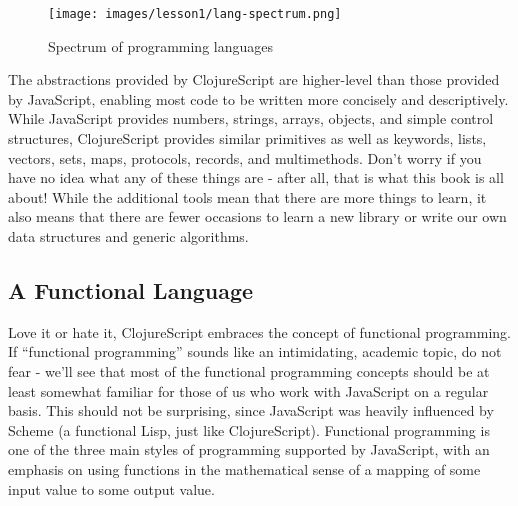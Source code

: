 \documentclass[10pt,twoside,openright]{memoir}
\begin{document}
\begin{figure}[H]
\caption{Spectrum of programming languages}
\centering
\texttt{[image: images/lesson1/lang-spectrum.png]}
\end{figure}

The abstractions provided by ClojureScript are higher-level than those
provided by JavaScript, enabling most code to be written more concisely
and descriptively. While JavaScript provides numbers, strings, arrays,
objects, and simple control structures, ClojureScript provides similar
primitives as well as keywords, lists, vectors, sets, maps, protocols,
records, and multimethods. Don't worry if you have no idea what any of
these things are - after all, that is what this book is all about! While
the additional tools mean that there are more things to learn, it also
means that there are fewer occasions to learn a new library or write our
own data structures and generic algorithms.

\subsection{A Functional Language}

Love it or hate it, ClojureScript embraces the concept of functional
programming. If ``functional programming'' sounds like an intimidating,
academic topic, do not fear - we'll see that most of the functional
programming concepts should be at least somewhat familiar for those of
us who work with JavaScript on a regular basis. This should not be
surprising, since JavaScript was heavily influenced by Scheme (a
functional Lisp, just like ClojureScript). Functional programming is one
of the three main styles of programming supported by JavaScript, with an
emphasis on using functions in the mathematical sense of a mapping of
some input value to some output value.
\end{document}
